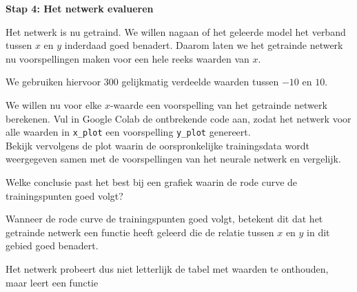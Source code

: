 \documentclass{ximera}
\begin{document}
\begin{question} \textbf{Stap 4: Het netwerk evalueren}

Het netwerk is nu getraind. We willen nagaan of het geleerde model het verband tussen $x$ en $y$ inderdaad goed benadert. Daarom laten we het getrainde netwerk nu voorspellingen maken voor een hele reeks waarden van $x$.

We gebruiken hiervoor 300 gelijkmatig verdeelde waarden tussen $-10$ en $10$.  

We willen nu voor elke $x$-waarde een voorspelling van het getrainde netwerk berekenen. Vul in Google Colab de ontbrekende code aan, zodat het netwerk voor alle waarden in \texttt{x\_plot} een voorspelling \texttt{y\_plot} genereert. \\
Bekijk vervolgens de plot waarin de oorspronkelijke trainingsdata wordt weergegeven samen met de voorspellingen van het neurale netwerk en vergelijk.

Welke conclusie past het best bij een grafiek waarin de rode curve de trainingspunten goed volgt?

\begin{multipleChoice}





\end{multipleChoice}

\begin{feedback} \text{ }

Wanneer de rode curve de trainingspunten goed volgt, betekent dit dat het getrainde netwerk een functie heeft geleerd die de relatie tussen $x$ en $y$
in dit gebied goed benadert.

Het netwerk probeert dus niet letterlijk de tabel met waarden te onthouden, maar leert een functie


\end{feedback}
\end{question}
\end{document}
